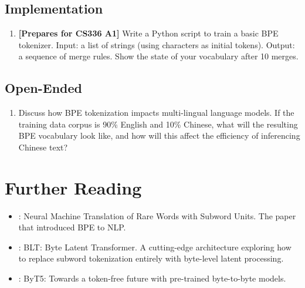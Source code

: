\subsection*{Implementation}
\begin{enumerate}
  \item \textbf{[Prepares for CS336 A1]} Write a Python script to train a basic BPE tokenizer. Input: a list of strings (using characters as initial tokens). Output: a sequence of merge rules. Show the state of your vocabulary after 10 merges.
\end{enumerate}

\subsection*{Open-Ended}
\begin{enumerate}
  \item Discuss how BPE tokenization impacts multi-lingual language models. If the training data corpus is 90\% English and 10\% Chinese, what will the resulting BPE vocabulary look like, and how will this affect the efficiency of inferencing Chinese text?
\end{enumerate}


\section{Further Reading}
\label{ch:07:sec:further}

\begin{itemize}
  \item \textcite{sennrich_2016}: Neural Machine Translation of Rare Words with Subword Units. The paper that introduced BPE to NLP.
  \item \textcite{blt_2024}: BLT: Byte Latent Transformer. A cutting-edge architecture exploring how to replace subword tokenization entirely with byte-level latent processing.
  \item \textcite{byt5_2021}: ByT5: Towards a token-free future with pre-trained byte-to-byte models.
\end{itemize}
